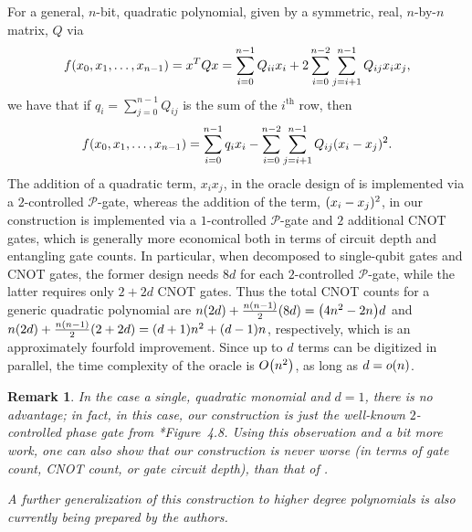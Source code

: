 \documentclass[reqno, 10pt]{amsart}
\numberwithin{equation}{section}                %
\let\originalleft\left
\let\originalright\right
\renewcommand{\left}{\mathopen{}\mathclose\bgroup\originalleft}
\renewcommand{\right}{\aftergroup\egroup\originalright}
\def\({\mathopen{}\left(}
\def\){\right)\mathclose{}}
\newtheorem{remark}[theorem]{Remark}
\def\cP{\mathcal{P}}
\begin{document}
\smallskip

For a general, $n$-bit, quadratic polynomial, given by a symmetric, real, $n$-by-$n$ matrix, $Q$ via
\begin{equation}
   f \( x_0, x_1, \ldots, x_{n - 1} \) = x^T Q x = \sum\limits_{i = 0}^{n - 1} Q_{ii} x_i + 2 \sum\limits_{i = 0}^{n - 2} \sum\limits_{j = i + 1}^{n - 1} Q_{ij} x_i x_j,
\end{equation}
we have that if $q_i = \sum\limits_{j = 0}^{n - 1} Q_{ij}$ is the sum of the $i^{\mathrm{th}}$ row, then
\begin{align}
   f \( x_0, x_1, \ldots, x_{n - 1} \) = \sum\limits_{i = 0}^{n - 1} q_i x_i - \sum\limits_{i = 0}^{n - 2} \sum\limits_{j = i + 1}^{n - 1} Q_{ij} \( x_i - x_j \)^2.
\end{align}
The addition of a quadratic term, $x_i x_j$, in the oracle design of \cite{gilliam_grover_2021} is implemented via a $2$-controlled $\cP$-gate, whereas the addition of the term, $\( x_i - x_j \)^2$, in our construction is implemented via a $1$-controlled $\cP$-gate and $2$ additional CNOT gates, which is generally more economical both in terms of circuit depth and entangling gate counts. In particular, when decomposed to single-qubit gates and CNOT gates, the former design needs $8d$ for each $2$-controlled $\cP$-gate, while the latter requires only $2 + 2d$ CNOT gates. Thus the total CNOT counts for a generic quadratic polynomial are $n \( 2 d \) + \tfrac{n \( n - 1 \)}{2} \( 8 d \) = \( 4 n^2 - 2 n \) d$ and $n \( 2 d \) + \tfrac{n \( n - 1 \)}{2} \( 2 + 2 d \) = \( d + 1 \) n^2 + \( d - 1\) n$, respectively, which is an approximately fourfold improvement. Since up to $d$ terms can be digitized in parallel, the time complexity of the oracle is $O \( n^2 \)$, as long as $d = o \( n \)$.

\smallskip

\begin{remark}
   In the case a single, quadratic monomial and $d = 1$, there is no advantage; in fact, in this case, our construction is just the well-known $2$-controlled phase gate from \cite{nielsen_quantum_2010}*{Figure~4.8}. Using this observation and a bit more work, one can also show that our construction is never worse (in terms of gate count, CNOT count, or gate circuit depth), than that of \cite{gilliam_grover_2021}.

   A further generalization of this construction to higher degree polynomials is also currently being prepared by the authors.
\end{remark}
\end{document}
